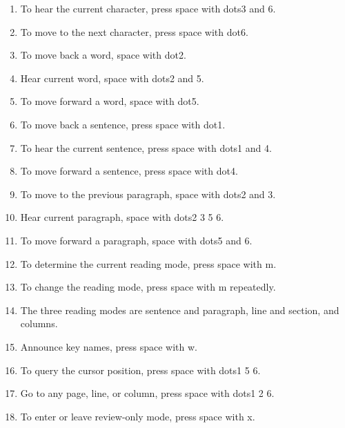 \documentclass[10pt,letterpaper,twoside]{report}
\begin{document}
{{{{\begin{enumerate}
	\item To hear the current character, press space with dots3 and 6.
	      
	\item To move to the next character, press space with dot6.
	      
	\item To move back a word, space with dot2.
	      
	\item Hear current word, space with dots2 and 5.
	      
	\item To move forward a word, space with dot5.
	      
	\item To move back a sentence, press space with dot1.
	      
	\item To hear the current sentence, press space with dots1 and 4.
	      
	\item To move forward a sentence, press space with dot4.
	      
	\item To move to the previous paragraph, space with dots2 and 3.
	      
	\item Hear current paragraph, space with dots2 3 5 6.
	      
	\item To move forward a paragraph, space with dots5 and 6.
	      
	\item To determine the current reading mode, press space with m.
	      
	\item To change the reading mode, press space with m repeatedly.
	      
	\item The three reading modes are sentence and paragraph, line and section, and columns.
	      
	\item Announce key names, press space with w.
	      
	\item To query the cursor position, press space with dots1 5 6.
	      
	\item Go to any page, line, or column, press space with dots1 2 6.
	      
	\item To enter or leave review-only mode, press space with x.
\end{enumerate}



}}}}
\end{document}
